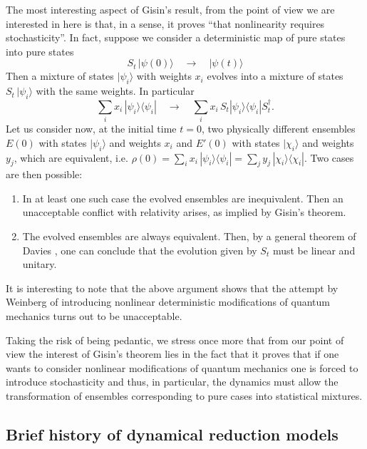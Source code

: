 \documentclass[10pt,a4paper]{article}
\begin{document}
The most interesting aspect of Gisin's result, from the point of
view we are interested in here is that, in a sense, it proves
``that nonlinearity requires stochasticity''. In fact, suppose we
consider a deterministic map of pure states into pure states
\begin{equation}
S_{t}\, |\psi(0)\rangle \quad \longrightarrow \quad
|\psi(t)\rangle
\end{equation}
Then a mixture of states $|\psi_{i}\rangle$ with weights $x_{i}$
evolves into a mixture of states $S_{t}\,|\psi_{i}\rangle$ with
the same weights. In particular
\begin{equation}
\sum_{i} x_{i}\, |\psi_{i}\rangle\langle\psi_{i}| \quad
\longrightarrow \quad \sum_{i} x_{i}\, S_{t}
|\psi_{i}\rangle\langle\psi_{i}| S_{t}^{\dagger}.
\end{equation}
Let us consider now, at the initial time $t=0$, two physically
different ensembles $E(0)$ with states $|\psi_{i}\rangle$ and
weights $x_{i}$ and $E'(0)$ with states $|\chi_{i}\rangle$ and
weights $y_{j}$, which are equivalent, i.e. $\rho(0) = \sum_{i}
x_{i}\, |\psi_{i}\rangle\langle\psi_{i}| = \sum_{j} y_{j}\,
|\chi_{i}\rangle\langle\chi_{i}|$. Two cases are then possible:
\begin{enumerate}
\item In at least one such case the evolved ensembles are
inequivalent. Then an unacceptable conflict with relativity
arises, as implied by Gisin's theorem.
\item The evolved ensembles are always equivalent. Then, by a
general theorem of Davies \cite{dav}, one can conclude that the
evolution given by $S_{t}$ must be linear and unitary.
\end{enumerate}
It is interesting to note that the above argument \cite{gisfl2}
shows that the attempt by Weinberg \cite{weifl} of introducing
nonlinear deterministic modifications of quantum mechanics turns
out to be unacceptable.

Taking the risk of being pedantic, we stress once more that from
our point of view the interest of Gisin's theorem lies in the fact
that it proves that if one wants to consider nonlinear
modifications of quantum mechanics one is forced to introduce
stochasticity and thus, in particular, the dynamics must allow the
transformation of ensembles corresponding to pure cases into
statistical mixtures.


\subsection{Brief history of dynamical reduction models}
\label{sec44}
\end{document}

